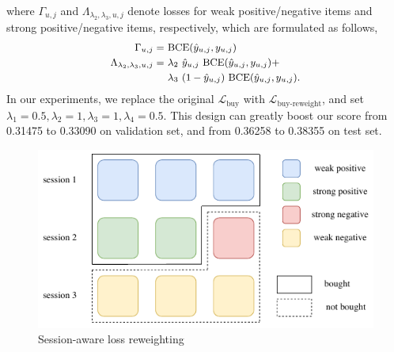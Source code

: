 \normalsize
where $\Gamma_{u,j}$ and $\Lambda_{\lambda_2,\lambda_3,u,j}$ denote losses for weak positive/negative items and strong positive/negative items, respectively, which are formulated as follows,
\begin{equation}
\footnotesize
\begin{aligned}
  \Gamma_{u,j} =& ~\text{BCE}(\hat{y}_{u,j}, y_{u,j})\\
  \Lambda_{\lambda_2,\lambda_3,u,j} =&  ~\lambda_2~\hat{y}_{u,j}~\text{BCE}(\hat{y}_{u,j}, y_{u,j})+ \\
  &~\lambda_3~(1-\hat{y}_{u,j})~\text{BCE}(\hat{y}_{u,j}, y_{u,j}).
\end{aligned}
\end{equation}
In our experiments, we replace the original $\mathcal{L}_{\text{buy}}$ with $\mathcal{L}_{\text{buy-reweight}}$, and set $\lambda_1 = 0.5, \lambda_2 = 1, \lambda_3 = 1, \lambda_4 = 0.5$.
This design can greatly boost our score from 0.31475 to 0.33090 on validation set, and from 0.36258 to 0.38355 on test set.

\begin{figure}[!t]
    \centering
    \includegraphics[width=\linewidth]{figures/reweightloss.pdf}
    \caption{Session-aware loss reweighting}
    \label{fig:reweightloss}
\end{figure}




